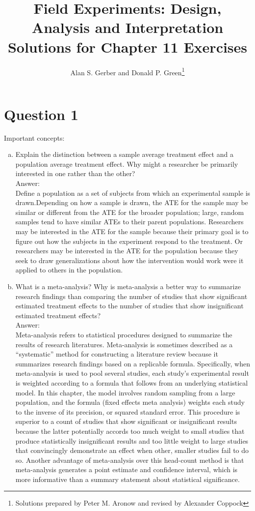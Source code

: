 \documentclass[11pt,notitlepage]{article}\usepackage[]{graphicx}\usepackage[]{color}
\title{Field Experiments: Design, Analysis and Interpretation \\
Solutions for Chapter 11 Exercises}
\author{Alan S. Gerber and Donald P. Green\footnote{Solutions prepared by Peter M. Aronow and revised by Alexander Coppock}}
\date{\vspace{-5ex}}
\begin{document}
\maketitle


\section*{Question 1}
Important concepts:
\begin{enumerate}[a)]
\item Explain the distinction between a sample average treatment effect and a population average treatment effect. Why might a researcher be primarily interested in one rather than the other? \\
Answer:\\
Define a population as a set of subjects from which an experimental sample is drawn.Depending on how a sample is drawn, the ATE for the sample may be similar or different from the ATE for the broader population; large, random samples tend to have similar ATEs to their parent populations. Researchers may be interested in the ATE for the sample because their primary goal is to figure out how the subjects in the experiment respond to the treatment. Or researchers may be interested in the ATE for the population because they seek to draw generalizations about how the intervention would work were it applied to others in the population. 

\item What is a meta-analysis? Why is meta-analysis a better way to summarize research findings than comparing the number of studies that show significant estimated treatment effects to the number of studies that show insignificant estimated treatment effects?\\
Answer:\\
Meta-analysis refers to statistical procedures designed to summarize the results of research literatures. Meta-analysis is sometimes described as a ``systematic'' method for constructing a literature review because it summarizes research findings based on a replicable formula. Specifically, when meta-analysis is used to pool several studies, each study's experimental result is weighted according to a formula that follows from an underlying statistical model. In this chapter, the model involves random sampling from a large population, and the formula (fixed effects meta analysis) weights each study to the inverse of its precision, or squared standard error. This procedure is superior to a count of studies that show significant or insignificant results because the latter potentially accords too much weight to small studies that produce statistically insignificant results and too little weight to large studies that convincingly demonstrate an effect when other, smaller studies fail to do so. Another advantage of meta-analysis over this head-count method is that meta-analysis generates a point estimate and confidence interval, which is more informative than a summary statement about statistical significance. 


\end{enumerate}
\end{document}
